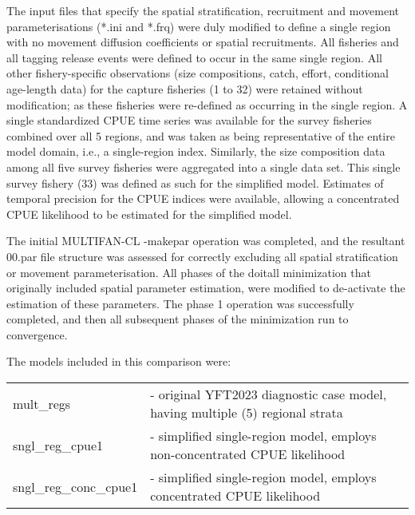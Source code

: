 \documentclass{SCreport}
\begin{document}
The input files that specify the spatial stratification, recruitment and
movement parameterisations (*.ini and *.frq) were duly modified to define a
single region with no movement diffusion coefficients or spatial recruitments.
All fisheries and all tagging release events were defined to occur in the same
single region. All other fishery-specific observations (size compositions,
catch, effort, conditional age-length data) for the capture fisheries (1 to 32)
were retained without modification; as these fisheries were re-defined as
occurring in the single region. A single standardized CPUE time series was
available for the survey fisheries combined over all 5 regions, and was taken as
being representative of the entire model domain, i.e., a single-region index.
Similarly, the size composition data among all five survey fisheries were
aggregated into a single data set. This single survey fishery (33) was defined
as such for the simplified model. Estimates of temporal precision for the CPUE
indices were available, allowing a concentrated CPUE likelihood to be estimated
for the simplified model.

The initial MULTIFAN-CL -makepar operation was completed, and the
resultant 00.par file structure was assessed for correctly excluding all spatial
stratification or movement parameterisation. All phases of the doitall
minimization that originally included spatial parameter estimation, were
modified to de-activate the estimation of these parameters. The phase 1
operation was successfully completed, and then all subsequent phases of the
minimization run to convergence.

The models included in this comparison were:

\begin{small}
  \begin{tabular}{ll}
    mult\_regs             & - original YFT2023 diagnostic case model, having
                             multiple (5) regional strata\\[1ex]
    sngl\_reg\_cpue1       & - simplified single-region model, employs
                             non-concentrated CPUE likelihood\\[1ex]
    sngl\_reg\_conc\_cpue1 & - simplified single-region model, employs
                             concentrated CPUE likelihood\\[1ex]
  \end{tabular}
\end{small}

\vspace{1ex}
\end{document}
